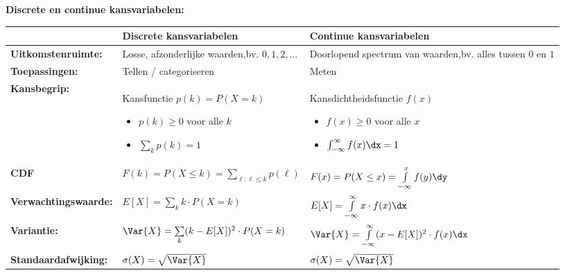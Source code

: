 \textbf{Discrete en continue kansvariabelen:}
\begin{table}[H]
    \renewcommand{\arraystretch}{1.8}
    \centering
    \begin{tabular}{m{3.8cm}m{6cm}m{5.7cm}}
        \toprule
            & \textbf{Discrete kansvariabelen}  & \textbf{Continue kansvariabelen} \\ 
        \midrule
            \textbf{Uitkomstenruimte:}                      & Losse, afzonderlijke waarden,\newline bv. $0, 1, 2, \ldots$  & Doorlopend spectrum van waarden,\newline bv. alles tussen $0$ en $1$ \\
            \textbf{Toepassingen:}                          & Tellen / categoriseren        & Meten \\
            \textbf{Kansbegrip:}                            & Kansfunctie $p(k) = P(X=k)$ \newline \begin{itemize} \item $p(k) \geq 0$ voor alle $k$ \item $\sum\limits_{k} p(k) = 1$ \end{itemize} & Kansdichtheidsfunctie $f(x)$ \newline \begin{itemize} \item $f(x) \geq 0$ voor alle $x$ \item $\int_{-\infty}^{\infty} f(x) \dx = 1$ \end{itemize} \\
            \textbf{CDF} & $F(k) = P(X \le k) = \sum\limits_{\ell:\ell\le k} p(\ell)$ & $F(x) = P(X \le x) = \int\limits_{-\infty}^{x} f(y)\dy$ \\
            \textbf{Verwachtingswaarde:}                    & $E[X] = \sum\limits_{k} k \cdot P(X=k)$ & $E[X] = \int\limits_{-\infty}^{\infty} x \cdot f(x)\dx$\\
            \textbf{Variantie:}                             & $\Var{X} = \sum\limits_{k} (k - E[X])^2 \cdot P(X=k)$   & $\Var{X} = \int\limits_{-\infty}^{\infty} (x - E[X])^2 \cdot f(x)\dx$ \\    
            \textbf{Standaardafwijking:}                    & $\sigma(X) = \sqrt{\Var{X}}$   & $\sigma(X) = \sqrt{\Var{X}}$ \\
        \bottomrule
    \end{tabular}
\end{table}

